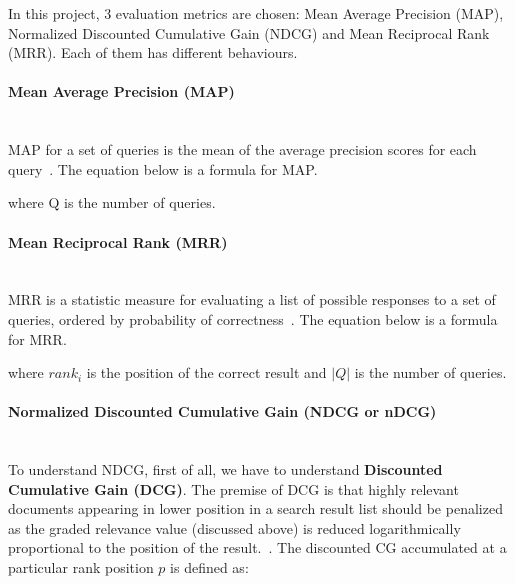 In this project, 3 evaluation metrics are chosen: Mean Average Precision (MAP), Normalized Discounted Cumulative Gain (NDCG) 
and Mean Reciprocal Rank (MRR). Each of them has different behaviours.

\paragraph{Mean Average Precision (MAP)} \hspace{0pt} \\
MAP for a set of queries is the mean of the average precision scores for each query~\cite{IR}. The equation below is
a formula for MAP.
\begin{center}
\end{center}
where Q is the number of queries.

\paragraph{Mean Reciprocal Rank (MRR)} \hspace{0pt} \\
MRR is a statistic measure for evaluating a list of possible responses to a set of queries, ordered by 
probability of correctness~\cite{mrr}. The equation below is a formula for MRR.
\begin{center}
\end{center}
where $rank_i$ is the position of the correct result and $|Q|$ is the number of queries.

\paragraph{Normalized Discounted Cumulative Gain (NDCG or nDCG)} \hspace{0pt} \\
To understand NDCG, first of all, we have to understand \textbf{Discounted Cumulative Gain (DCG)}. 
The premise of DCG is that highly relevant documents appearing in lower position in a search result list should be penalized as 
the graded relevance value (discussed above) is 
reduced logarithmically proportional to the position of the result.~\cite{ndcg}. The discounted CG accumulated at a particular rank position
$p$ is defined as:

